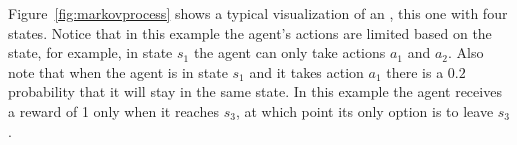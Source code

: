 \begin{SCfigure}
\begin{minipage}{1.0\linewidth}
\begin{center}
    \end{center}
  \end{minipage}
  \caption{Graphical representation of a sample Markov decision
    process along with values for the transition and reward functions.
    We let the start state be $s_1$.}
  \label{fig:markovprocess}
\end{SCfigure}

Figure~\ref{fig:markovprocess} shows a typical visualization of an
, this one with four states. Notice that in this example the
agent's actions are limited based on the state, for example, in state
$s_1$ the agent can only take actions $a_1$ and $a_2$. Also note that
when the agent is in state $s_1$ and it takes action $a_1$ there is a
$0.2$ probability that it will stay in the same state. In this example
the agent receives a reward of 1 only when it reaches $s_3$, at which
point its only option is to leave $s_3$.

